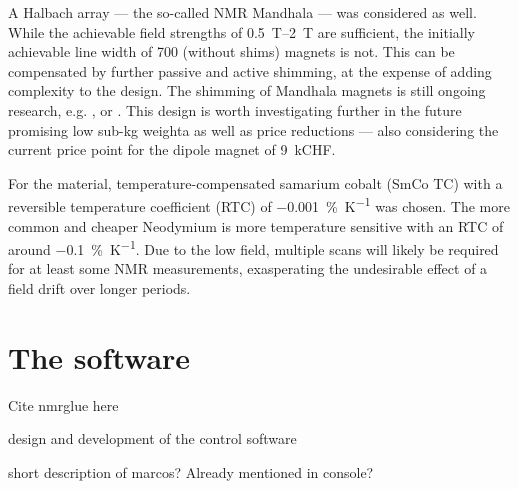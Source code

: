 A Halbach array --- the so-called NMR Mandhala --- was considered as well. While the achievable field strengths of \qtyrange{0.5}{2}{\tesla}  are sufficient, the initially achievable line width of \qty{700}{\partspermillion}  (without shims) magnets is not. This can be compensated by further passive and active shimming, at the expense of adding complexity to the design. The shimming of Mandhala magnets is still ongoing research, e.g. ,  or . This design is worth investigating further in the future promising low sub-kg weighta as well as price reductions --- also considering the current price point for the dipole magnet of \approx \qty{9}{kCHF}.

For the material, temperature-compensated samarium cobalt (SmCo TC) with a reversible temperature coefficient (RTC) of \qty{-0.001}{\%\per\kelvin} was chosen. The more common and cheaper Neodymium is more temperature sensitive with an RTC of around \qty{-0.1}{\%\per\kelvin}. Due to the low field, multiple scans will likely be required for at least some NMR measurements, exasperating the undesirable effect of a field drift over longer periods.

\section{The software}

Cite nmrglue here 

design and development of the control software

short description of marcos? Already mentioned in console?


